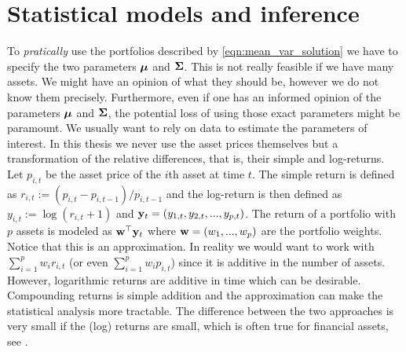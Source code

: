 \documentclass[oneside]{book}\usepackage{knitr}
\begin{document}

\chapter[Models \& inference]{Statistical models and inference}\label{ch:estim}


To \textit{pratically} use the portfolios described by \eqref{eqn:mean_var_solution} we have to specify the two parameters $\mbox{\boldmath$\mu$}$ and $\mathbf{\Sigma}$. 
This is not really feasible if we have many assets. 
We might have an opinion of what they should be, however we do not know them precisely.  
Furthermore, even if one has an informed opinion of the parameters $\mbox{\boldmath$\mu$}$ and $\mathbf{\Sigma}$, the potential loss of using those exact parameters might be paramount. 
We usually want to rely on data to estimate the parameters of interest.
In this thesis we never use the asset prices themselves but a transformation of the relative differences, that is, their simple and log-returns. 
Let $p_{i,t}$ be the asset price of the $i$th asset at time $t$. 
The simple return is defined as $r_{i,t} := (p_{i,t}-p_{i,t-1})/p_{i,t-1}$ and the log-return is then defined as $y_{i,t} := \log(r_{i,t} + 1)$ and $\mathbf{y}_t=(y_{1,t},y_{2,t},..., y_{p,t})$.
The return of a portfolio with $p$ assets is modeled as $\mathbf{w}^\top \mathbf{y}_t$ where $\mathbf{w}=(w_1, ..., w_p)$ are the portfolio weights.
Notice that this is an approximation. 
In reality we would want to work with $\sum_{i=1}^p w_i r_{i,t}$ (or even $\sum_{i=1}^p w_i p_{i,t}$) since it is additive in the number of assets.
However, logarithmic returns are additive in time which can be desirable. 
Compounding returns is simple addition and the approximation can make the statistical analysis more tractable. 
The difference between the two approaches is very small if the (log) returns are small, which is often true for financial assets, see \citet[p. 5]{tsay2005analysis}. 
\end{document}

